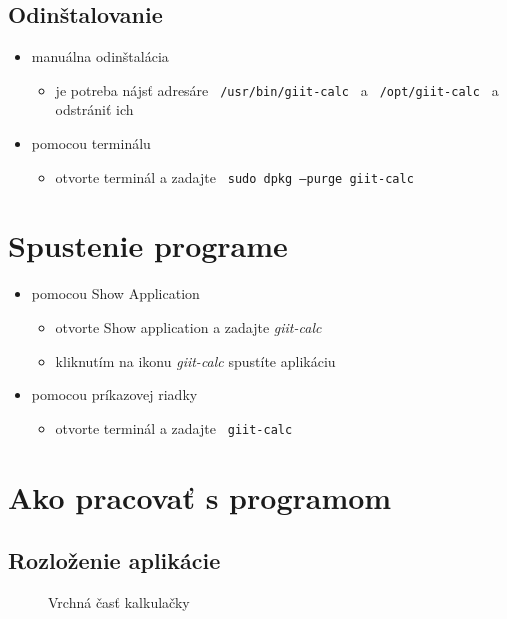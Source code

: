 \documentclass[a4paper, 11pt]{article}
\begin{document}
    \subsection{Odinštalovanie}
    \begin{itemize}
        \item manuálna odinštalácia
        \begin{itemize}
            \item je potreba nájsť adresáre \texttt{ /usr/bin/giit-calc } a \texttt{ /opt/giit-calc } a odstrániť ich
        \end{itemize}
        \item pomocou terminálu
        \begin{itemize}
            \item otvorte terminál a zadajte \texttt{ sudo dpkg --purge giit-calc }
        \end{itemize}
    \end{itemize}
    \section{Spustenie programe}
    \begin{itemize}
        \item pomocou Show Application
        \begin{itemize}
            \item otvorte Show application a zadajte \emph{giit-calc}
            \item kliknutím na ikonu \emph{giit-calc} spustíte aplikáciu
        \end{itemize}
    \end{itemize}
    \begin{itemize}
        \item pomocou príkazovej riadky
        \begin{itemize}
            \item otvorte terminál a zadajte \texttt{ giit-calc }
        \end{itemize}
    \end{itemize}
    \newpage
    \section{Ako pracovať s programom}
    \subsection{Rozloženie aplikácie}
    \begin{figure}[!h]
        \centering
        \caption{Vrchná časť kalkulačky}
        \label{fig:obrazok1}
    \end{figure}
    
\end{document}
